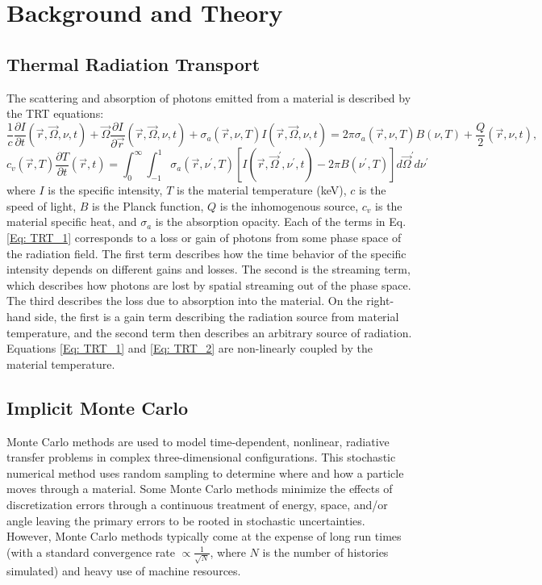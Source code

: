 \documentclass[]{article}
\begin{document}
\section{Background and Theory}
	\subsection{Thermal Radiation Transport}
		The scattering and absorption of photons emitted from a material is described by the TRT equations:
		\begin{equation} \label{Eq: TRT_1}
		\frac{1}{c} \frac{\partial I}{\partial t}(\vec{r}, \vec{\Omega}, \nu, t) + \vec{\Omega} \frac{\partial I}{\partial \vec{r}}(\vec{r}, \vec{\Omega}, \nu, t) + \sigma_{a}(\vec{r}, \nu, T)I(\vec{r}, \vec{\Omega}, \nu, t) = 2 \pi \sigma_{a}(\vec{r}, \nu, T)B(\nu, T) + \frac{Q}{2}(\vec{r}, \nu, t),
		\end{equation}
		\begin{equation} \label{Eq: TRT_2}
		c_{v}(\vec{r}, T) \frac{\partial T}{\partial t}(\vec{r},t) = \int_{0}^{\infty} \int_{-1}^{1} \sigma_{a}(\vec{r}, \nu^{\prime}, T)[I(\vec{r}, \vec{\Omega}^{\prime}, \nu^{\prime}, t) - 2 \pi B(\nu^{\prime}, T)] d \vec{\Omega}^{\prime} d \nu^{\prime}
		\end{equation}
		where $I$ is the specific intensity, $T$ is the material temperature (keV), $c$ is the speed of light, $B$ is the Planck function, $Q$ is the inhomogenous source, $c_{v}$ is the material specific heat, and $\sigma_{a}$ is the absorption opacity. Each of the terms in Eq. \ref{Eq: TRT_1} corresponds to a loss or gain of photons from some phase space of the radiation field. The first term describes how the time behavior of the specific intensity depends on different gains and losses. The second is the streaming term, which describes how photons are lost by spatial streaming out of the phase space. The third describes the loss due to absorption into the material. On the right-hand side, the first is a gain term describing the radiation source from material temperature, and the second term then describes an arbitrary source of radiation. Equations \ref{Eq: TRT_1} and \ref{Eq: TRT_2} are non-linearly coupled by the material temperature.

	\subsection{Implicit Monte Carlo}
		Monte Carlo methods are used to model time-dependent, nonlinear, radiative transfer problems in complex three-dimensional configurations. This stochastic numerical method uses random sampling to determine where and how a particle moves through a material. Some Monte Carlo methods minimize the effects of discretization errors through a continuous treatment of energy, space, and/or angle leaving the primary errors to be rooted in stochastic uncertainties. However, Monte Carlo methods typically come at the expense of long run times (with a standard convergence rate $\propto\frac{1}{\sqrt{N}}$, where $N$ is the number of histories simulated) and heavy use of machine resources.
\end{document}
